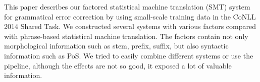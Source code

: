 This paper describes our factored statistical machine translation (SMT) system for grammatical error correction by using small-scale training data in the CoNLL 2014 Shared Task. We constructed several systems with various factors compared with phrase-based statistical machine translation. The factors contain not only morphological information such as stem, prefix, suffix, but also syntactic information such as PoS. We tried to easily combine different systems or use the pipeline, although the effects are not so good, it exposed a lot of valuable information.
